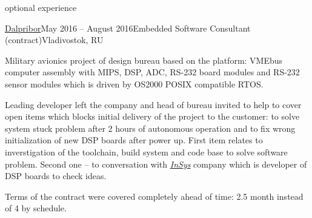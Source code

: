\documentclass{template}
\begin{document}

\begin{rSection}{optional experience}
\begin{rCompany}{\href{http://dalpribor.ru}{Dalpribor}}{May 2016 -- August 2016}{Embedded Software Consultant (contract)}{Vladivostok, RU}

\item Military avionics project of design bureau based on the  platform: VMEbus computer assembly with MIPS, DSP, ADC, RS-232
      board modules and RS-232 sensor modules which is driven by OS2000 POSIX compatible RTOS.
\item Leading developer left the company and head of bureau invited to help to cover open items which blocks initial delivery of the project to
      the customer: to solve system stuck problem after 2 hours of autonomous operation and to fix wrong initialization of new DSP boards after
      power up. First item relates to inverstigation of the toolchain, build system and code base to solve software problem. Second one -- to conversation
      with \href{http://www.insys.ru}{\textit{InSys}} company which is developer of DSP boards to check ideas.
\item Terms of the contract were covered completely ahead of time: 2.5 month instead of 4 by schedule.

\end{rCompany}
\end{rSection}

\end{document}
